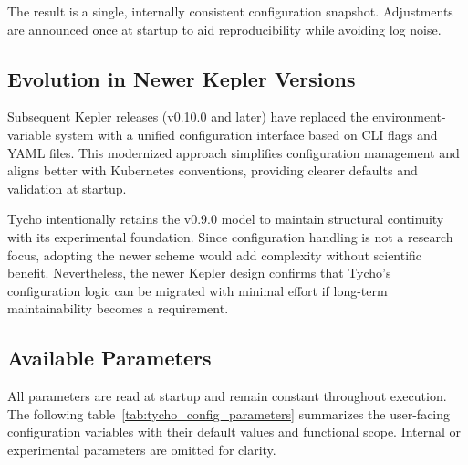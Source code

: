 The result is a single, internally consistent configuration snapshot.
Adjustments are announced once at startup to aid reproducibility while avoiding log noise.

\subsection{Evolution in Newer Kepler Versions}
\label{subsubsec:tycho_config_evolution}

Subsequent Kepler releases (v0.10.0 and later) have replaced the environment-variable system with a unified configuration interface based on CLI flags and YAML files.
This modernized approach simplifies configuration management and aligns better with Kubernetes conventions, providing clearer defaults and validation at startup.

Tycho intentionally retains the v0.9.0 model to maintain structural continuity with its experimental foundation.
Since configuration handling is not a research focus, adopting the newer scheme would add complexity without scientific benefit.
Nevertheless, the newer Kepler design confirms that Tycho’s configuration logic can be migrated with minimal effort if long-term maintainability becomes a requirement.

\subsection{Available Parameters}
\label{subsubsec:tycho_config_parameters}

All parameters are read at startup and remain constant throughout execution.
The following table~\ref{tab:tycho_config_parameters} summarizes the user-facing configuration variables with their default values and functional scope.
Internal or experimental parameters are omitted for clarity.


